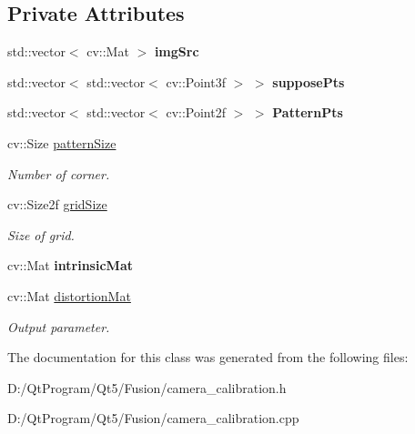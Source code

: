 \subsection*{Private Attributes}
\begin{DoxyCompactItemize}
\item 
\hypertarget{classcamera__calibration_a85ae9430f0fc83701195274ecfeabedd}{}std\+::vector$<$ cv\+::\+Mat $>$ {\bfseries img\+Src}\label{classcamera__calibration_a85ae9430f0fc83701195274ecfeabedd}

\item 
\hypertarget{classcamera__calibration_af721b99676dffbd6b76337094abb0364}{}std\+::vector$<$ std\+::vector$<$ cv\+::\+Point3f $>$ $>$ {\bfseries suppose\+Pts}\label{classcamera__calibration_af721b99676dffbd6b76337094abb0364}

\item 
\hypertarget{classcamera__calibration_a861094e4bf699de1bc8e5fb02c6b1e48}{}std\+::vector$<$ std\+::vector$<$ cv\+::\+Point2f $>$ $>$ {\bfseries Pattern\+Pts}\label{classcamera__calibration_a861094e4bf699de1bc8e5fb02c6b1e48}

\item 
\hypertarget{classcamera__calibration_acfe849351fc596d3b7abc05f732d7138}{}cv\+::\+Size \hyperlink{classcamera__calibration_acfe849351fc596d3b7abc05f732d7138}{pattern\+Size}\label{classcamera__calibration_acfe849351fc596d3b7abc05f732d7138}

\begin{DoxyCompactList}\small\item\em Number of corner. \end{DoxyCompactList}\item 
\hypertarget{classcamera__calibration_a93d04e4b624695a6d537efc541dfa901}{}cv\+::\+Size2f \hyperlink{classcamera__calibration_a93d04e4b624695a6d537efc541dfa901}{grid\+Size}\label{classcamera__calibration_a93d04e4b624695a6d537efc541dfa901}

\begin{DoxyCompactList}\small\item\em Size of grid. \end{DoxyCompactList}\item 
\hypertarget{classcamera__calibration_a977e20ebb834c981fe850c0e1bcb7c2e}{}cv\+::\+Mat {\bfseries intrinsic\+Mat}\label{classcamera__calibration_a977e20ebb834c981fe850c0e1bcb7c2e}

\item 
\hypertarget{classcamera__calibration_a9761b3623fc1ad8ca2adf0c65f4a4674}{}cv\+::\+Mat \hyperlink{classcamera__calibration_a9761b3623fc1ad8ca2adf0c65f4a4674}{distortion\+Mat}\label{classcamera__calibration_a9761b3623fc1ad8ca2adf0c65f4a4674}

\begin{DoxyCompactList}\small\item\em Output parameter. \end{DoxyCompactList}\end{DoxyCompactItemize}


The documentation for this class was generated from the following files\+:\begin{DoxyCompactItemize}
\item 
D\+:/\+Qt\+Program/\+Qt5/\+Fusion/camera\+\_\+calibration.\+h\item 
D\+:/\+Qt\+Program/\+Qt5/\+Fusion/camera\+\_\+calibration.\+cpp\end{DoxyCompactItemize}
